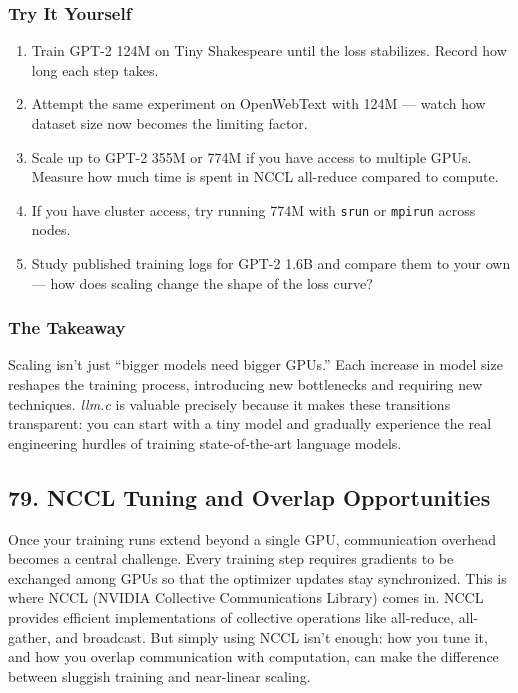 \documentclass[
  letterpaper,
  DIV=11,
  numbers=noendperiod]{scrreprt}
\providecommand{\tightlist}{%
  \setlength{\itemsep}{0pt}\setlength{\parskip}{0pt}}
\begin{document}
\subsubsection{Try It Yourself}\label{try-it-yourself-66}

\begin{enumerate}
\def\labelenumi{\arabic{enumi}.}
\tightlist
\item
  Train GPT-2 124M on Tiny Shakespeare until the loss stabilizes. Record
  how long each step takes.
\item
  Attempt the same experiment on OpenWebText with 124M --- watch how
  dataset size now becomes the limiting factor.
\item
  Scale up to GPT-2 355M or 774M if you have access to multiple GPUs.
  Measure how much time is spent in NCCL all-reduce compared to compute.
\item
  If you have cluster access, try running 774M with \texttt{srun} or
  \texttt{mpirun} across nodes.
\item
  Study published training logs for GPT-2 1.6B and compare them to your
  own --- how does scaling change the shape of the loss curve?
\end{enumerate}

\subsubsection{The Takeaway}\label{the-takeaway-67}

Scaling isn't just ``bigger models need bigger GPUs.'' Each increase in
model size reshapes the training process, introducing new bottlenecks
and requiring new techniques. \emph{llm.c} is valuable precisely because
it makes these transitions transparent: you can start with a tiny model
and gradually experience the real engineering hurdles of training
state-of-the-art language models.

\subsection{79. NCCL Tuning and Overlap
Opportunities}\label{nccl-tuning-and-overlap-opportunities}

Once your training runs extend beyond a single GPU, communication
overhead becomes a central challenge. Every training step requires
gradients to be exchanged among GPUs so that the optimizer updates stay
synchronized. This is where NCCL (NVIDIA Collective Communications
Library) comes in. NCCL provides efficient implementations of collective
operations like all-reduce, all-gather, and broadcast. But simply using
NCCL isn't enough: how you tune it, and how you overlap communication
with computation, can make the difference between sluggish training and
near-linear scaling.
\end{document}
